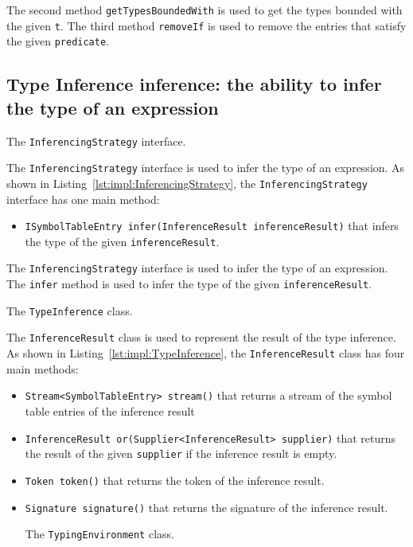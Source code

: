 The second method \texttt{getTypesBoundedWith} is used to get the types bounded with the given \texttt{t}. The third method \texttt{removeIf} is used to remove the entries that satisfy the given \texttt{predicate}.

\subsection{Type Inference inference: the ability to infer the type of an expression}\label{subsec:impl:TypeInference}

\begin{Listing}[tbh]
    \centering
    \caption{The \texttt{InferencingStrategy} interface.}
    \label{lst:impl:InferencingStrategy}
\end{Listing}

The \texttt{InferencingStrategy} interface is used to infer the type of an expression. As shown in Listing~\ref{lst:impl:InferencingStrategy}, the \texttt{InferencingStrategy} interface has one main method:
\begin{itemize}
    \item \texttt{ISymbolTableEntry infer(InferenceResult inferenceResult)} that infers the type of the given \texttt{inferenceResult}.
\end{itemize}

The \texttt{InferencingStrategy} interface is used to infer the type of an expression. The \texttt{infer} method is used to infer the type of the given \texttt{inferenceResult}.

\begin{Listing}[tbh]
    \centering
    \caption{The \texttt{TypeInference} class.}
    \label{lst:impl:TypeInference}
\end{Listing}

The \texttt{InferenceResult} class is used to represent the result of the type inference. As shown in Listing~\ref{lst:impl:TypeInference}, the \texttt{InferenceResult} class has four main methods:
\begin{itemize}
    \item \texttt{Stream<SymbolTableEntry> stream()} that returns a stream of the symbol table entries of the inference result
    \item \texttt{InferenceResult or(Supplier<InferenceResult> supplier)} that returns the result of the given \texttt{supplier} if the inference result is empty.
    \item \texttt{Token token()} that returns the token of the inference result.
    \item \texttt{Signature signature()} that returns the signature of the inference result.


\begin{Listing}[t]
    \centering
    \caption{The \texttt{TypingEnvironment} class.}
    \label{lst:impl:TypingEnvironment}
\end{Listing}

\end{itemize}
